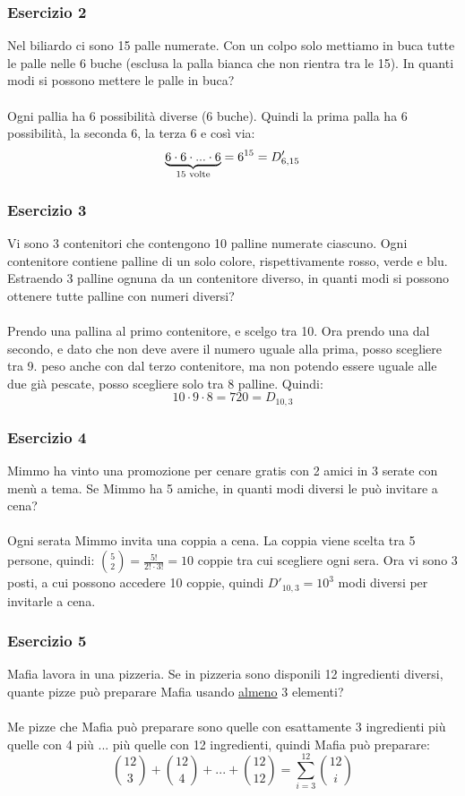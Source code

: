 \documentclass[italian]{article}
\newcommand{\disps}[2]{\text{$D_{#1,#2}$}}
\newcommand{\dispr}[2]{\text{$D'_{#1,#2}$}}
\begin{document}
\subsubsection{Esercizio 2}
Nel biliardo ci sono 15 palle numerate. Con un colpo solo mettiamo in buca tutte le palle nelle 6 buche (esclusa la palla bianca che non rientra tra le 15). In quanti modi si possono mettere le palle in buca?\\\\
Ogni pallia ha 6 possibilità diverse (6 buche). Quindi la prima palla ha 6 possibilità, la seconda 6, la terza 6 e così via:
\[
	\underbrace{6\cdot6\cdot ... \cdot 6}_{\mathclap{\text{15 volte}}} = 6^{15} = \dispr{6}{15}
\]

\subsubsection{Esercizio 3}
Vi sono 3 contenitori che contengono 10 palline numerate ciascuno. Ogni contenitore contiene palline di un solo colore, rispettivamente rosso, verde e blu. Estraendo 3 palline ognuna da un contenitore diverso, in quanti modi si possono ottenere tutte palline con numeri diversi?\\\\
Prendo una pallina al primo contenitore, e scelgo tra 10. Ora prendo una dal secondo, e dato che non deve avere il numero uguale alla prima, posso scegliere tra 9. peso anche con dal terzo contenitore, ma non potendo essere uguale alle due già pescate, posso scegliere solo tra 8 palline. Quindi:
\[
	10\cdot9\cdot8 = 720 = \disps{10}{3}
\]

\subsubsection{Esercizio 4}
Mimmo ha vinto una promozione per cenare gratis con 2 amici in 3 serate con menù a tema. Se Mimmo ha 5 amiche, in quanti modi diversi le può invitare a cena?\\\\
Ogni serata Mimmo invita una coppia a cena. La coppia viene scelta tra 5 persone, quindi: $\binom{5}{2} = \frac{5!}{2!\cdot3!} = 10$ coppie tra cui scegliere ogni sera. Ora vi sono 3 posti, a cui possono accedere 10 coppie, quindi $\dispr{10}{3} = 10^3$ modi diversi per invitarle a cena.

\subsubsection{Esercizio 5}
Mafia lavora in una pizzeria. Se in pizzeria sono disponili 12 ingredienti diversi, quante pizze può preparare Mafia usando \underline{almeno} 3 elementi?\\\\
Me pizze che Mafia può preparare sono quelle con esattamente 3 ingredienti più quelle con 4 più ... più quelle con 12 ingredienti, quindi Mafia può preparare:
\[
	\binom{12}{3} + \binom{12}{4} + ... + \binom{12}{12} = \sum_{i=3}^{12}\binom{12}{i}
\]
\end{document}
